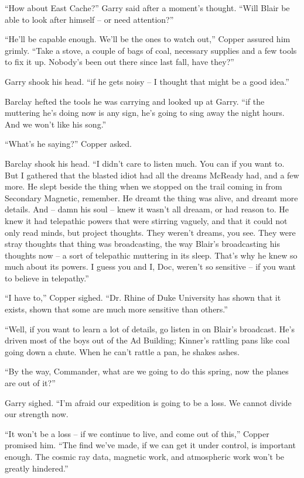 \documentclass[ebook,oneside,11pt]{memoir}				%
\begin{document}
``How about East Cache?'' Garry said after a moment's thought. ``Will Blair be able to look after himself -- or need attention?''

``He'll be capable enough. We'll be the ones to watch out,'' Copper assured him grimly. ``Take a stove, a couple of bags of coal, necessary supplies and a few tools to fix it up. Nobody's been out there since last fall, have they?''

Garry shook his head. ``if he gets noisy -- I thought that might be a good idea.''

Barclay hefted the tools he was carrying and looked up at Garry. ``if the muttering he's doing now is any sign, he's going to sing away the night hours. And we won't like his song.''

``What's he saying?'' Copper asked.

Barclay shook his head. ``I didn't care to listen much. You can if you want to. But I gathered that the blasted idiot had all the dreams McReady had, and a few more. He slept beside the thing when we stopped on the trail coming in from Secondary Magnetic, remember. He dreamt the thing was alive, and dreamt more details. And -- damn his soul -- knew it wasn't all dreaam, or had reason to. He knew it had telepathic powers that were stirring vaguely, and that it could not only read minds, but project thoughts. They weren't dreams, you see. They were stray thoughts that thing was broadcasting, the way Blair's broadcasting his thoughts now -- a sort of telepathic muttering in its sleep. That's why he knew so much about its powers. I guess you and I, Doc, weren't so sensitive -- if you want to believe in telepathy.''

``I have to,'' Copper sighed. ``Dr. Rhine of Duke University has shown that it exists, shown that some are much more sensitive than others.''

``Well, if you want to learn a lot of details, go listen in on Blair's broadcast. He's driven most of the boys out of the Ad Building; Kinner's rattling pans like coal going down a chute. When he can't rattle a pan, he shakes ashes.

``By the way, Commander, what are we going to do this spring, now the planes are out of it?''

Garry sighed. ``I'm afraid our expedition is going to be a loss. We cannot divide our strength now.

``It won't be a loss -- if we continue to live, and come out of this,'' Copper promised him. ``The find we've made, if we can get it under control, is important enough. The cosmic ray data, magnetic work, and atmospheric work won't be greatly hindered.''
\end{document}
